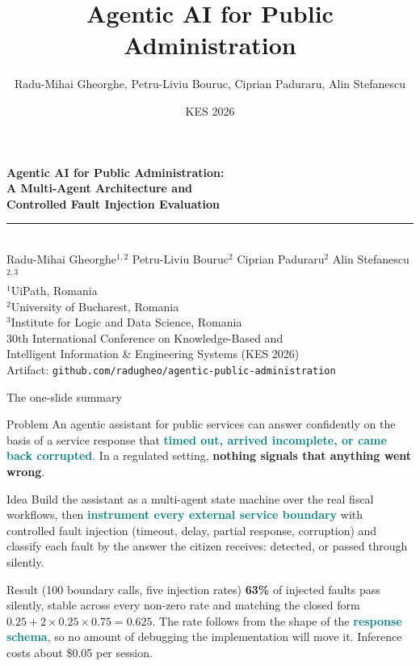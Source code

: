 \documentclass[aspectratio=169,10pt]{beamer}
\title[Agentic AI]{Agentic AI for Public Administration}
\author{Radu-Mihai Gheorghe, Petru-Liviu Bouruc, Ciprian Paduraru, Alin Stefanescu}
\date{KES 2026}
\newcommand{\hl}[1]{\textcolor{teal}{\textbf{#1}}}      %
\newcommand{\risk}[1]{\textcolor{rust}{\textbf{#1}}}    %
\begin{document}
\begin{frame}
  \vfill
  \centering
  {\color{teal}\large\bfseries
   Agentic AI for Public Administration:\\[0.15em]
   A Multi-Agent Architecture and\\[0.15em]
   Controlled Fault Injection Evaluation}\\[0.8em]
  {\color{rust}\rule{0.42\paperwidth}{1pt}}\\[1.1em]

  Radu-Mihai Gheorghe$^{1,2}$ \quad Petru-Liviu Bouruc$^{2}$ \quad
  Ciprian Paduraru$^{2}$ \quad Alin Stefanescu$^{2,3}$\\[0.9em]

  {\footnotesize $^{1}$UiPath, Romania}\\[0.3em]
  {\footnotesize $^{2}$University of Bucharest, Romania}\\[0.3em]
  {\footnotesize $^{3}$Institute for Logic and Data Science, Romania}\\[1.2em]

  30th International Conference on Knowledge-Based and\\
  Intelligent Information \& Engineering Systems (KES 2026)\\[1.1em]

  {\color{stone}\footnotesize Artifact:
   \texttt{github.com/radugheo/agentic-public-administration}}
  \vfill
\end{frame}

\begin{frame}{The one-slide summary}
  \begin{block}{Problem}
    An agentic assistant for public services can answer confidently on the basis of a service
    response that \hl{timed out, arrived incomplete, or came back corrupted}.
    In a regulated setting, \risk{nothing signals that anything went wrong}.
  \end{block}
  \begin{block}{Idea}
    Build the assistant as a multi-agent state machine over the real fiscal workflows, then
    \hl{instrument every external service boundary} with controlled fault injection (timeout,
    delay, partial response, corruption) and classify each fault by the answer the citizen
    receives: detected, or passed through silently.
  \end{block}
  \begin{block}{Result (100 boundary calls, five injection rates)}
    \risk{63\%} of injected faults pass silently, stable across every non-zero rate and
    matching the closed form $0.25 + 2 \times 0.25 \times 0.75 = 0.625$. The rate follows from
    the shape of the \hl{response schema}, so no amount of debugging the implementation will
    move it. Inference costs about \$0.05 per session.
  \end{block}
\end{frame}
\end{document}
